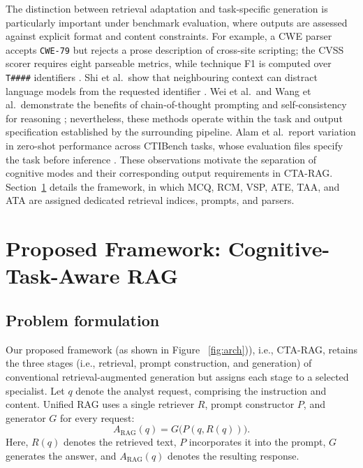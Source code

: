 \documentclass[5p,times,authoryear]{elsarticle}
\begin{document}
The distinction between retrieval adaptation and task-specific generation is particularly important under benchmark evaluation, where outputs are assessed against explicit format and content constraints. For example, a CWE parser accepts \texttt{CWE-79} but rejects a prose description of cross-site scripting; the CVSS scorer requires eight parseable metrics, while technique F1 is computed over \texttt{T\#\#\#\#} identifiers \citep{alam2024ctibench,mitre2024cwe,first2024cvss,mitre2024attack}. Shi et al.\ show that neighbouring context can distract language models from the requested identifier \citep{shi2023distracted}. Wei et al.\ and Wang et al.\ demonstrate the benefits of chain-of-thought prompting and self-consistency for reasoning \citep{wei2022chain,wang2023selfconsistency}; nevertheless, these methods operate within the task and output specification established by the surrounding pipeline. Alam et al.\ report variation in zero-shot performance across CTIBench tasks, whose evaluation files specify the task before inference \citep{alam2024ctibench}. These observations motivate the separation of cognitive modes and their corresponding output requirements in CTA-RAG. Section~\ref{sec:method} details the framework, in which MCQ, RCM, VSP, ATE, TAA, and ATA are assigned dedicated retrieval indices, prompts, and parsers.


\section{Proposed Framework: Cognitive-Task-Aware RAG}\label{sec:method}

\subsection{Problem formulation}\label{sec:formulation}

Our proposed framework (as shown in Figure ~\ref{fig:arch})), i.e., CTA-RAG, retains the three stages (i.e., retrieval, prompt construction, and generation) of conventional retrieval-augmented generation but assigns each stage to a selected specialist. Let $q$ denote the analyst request, comprising the instruction and content. Unified RAG uses a single retriever $R$, prompt constructor $P$, and generator $G$ for every request:
\begin{equation}
A_{\mathrm{RAG}}(q)=G\bigl(P(q,R(q))\bigr).
\label{eq:rag}
\end{equation}
Here, $R(q)$ denotes the retrieved text, $P$ incorporates it into the prompt, $G$ generates the answer, and $A_{\mathrm{RAG}}(q)$ denotes the resulting response.
\end{document}
